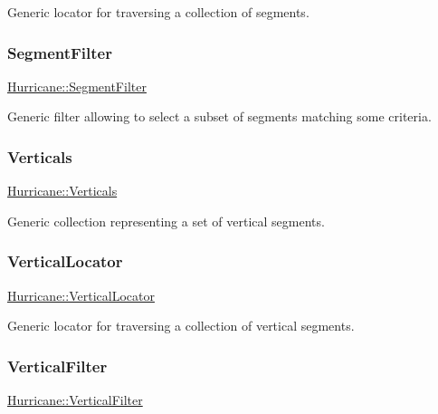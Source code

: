 Generic locator for traversing a collection of segments. \mbox{\label{namespaceHurricane_a891c4a2d614e158d183dada8b0ab1747}} 
\subsubsection{\texorpdfstring{Segment\+Filter}{SegmentFilter}}
{\footnotesize\ttfamily \mbox{\hyperlink{namespaceHurricane_a891c4a2d614e158d183dada8b0ab1747}{Hurricane\+::\+Segment\+Filter}}}

Generic filter allowing to select a subset of segments matching some criteria. \mbox{\label{namespaceHurricane_a146e2d3d34b4035aff422f12e85345b9}} 
\subsubsection{\texorpdfstring{Verticals}{Verticals}}
{\footnotesize\ttfamily \mbox{\hyperlink{namespaceHurricane_a146e2d3d34b4035aff422f12e85345b9}{Hurricane\+::\+Verticals}}}

Generic collection representing a set of vertical segments. \mbox{\label{namespaceHurricane_a0b7ececb547a716d7d509210a271aae4}} 
\subsubsection{\texorpdfstring{Vertical\+Locator}{VerticalLocator}}
{\footnotesize\ttfamily \mbox{\hyperlink{namespaceHurricane_a0b7ececb547a716d7d509210a271aae4}{Hurricane\+::\+Vertical\+Locator}}}

Generic locator for traversing a collection of vertical segments. \mbox{\label{namespaceHurricane_a3ac8462f707e425944df83c57835b13d}} 
\subsubsection{\texorpdfstring{Vertical\+Filter}{VerticalFilter}}
{\footnotesize\ttfamily \mbox{\hyperlink{namespaceHurricane_a3ac8462f707e425944df83c57835b13d}{Hurricane\+::\+Vertical\+Filter}}}

